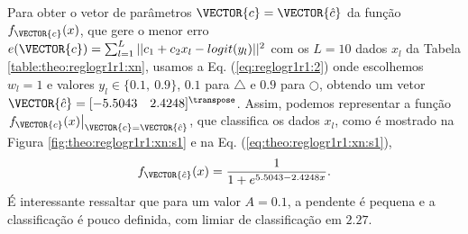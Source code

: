\begin{SolutionT}\label{sol:theo:reglogr1r1:s1}
Para obter o vetor de parâmetros $\VECTOR{c}=\VECTOR{\hat{c}}$ da função $f_{\VECTOR{c}}(x)$, 
que gere o menor erro $e(\VECTOR{c}) =  \sum_{l=1}^{L} ||c_1 +c_2 x_l-logit(y_l)||^2$
com os $L=10$ dados $x_l$ da Tabela \ref{table:theo:reglogr1r1:xn},
usamos a Eq. (\ref{eq:reglogr1r1:2}) onde escolhemos $w_l=1$ e valores $y_l \in \{0.1,~ 0.9\}$,
$0.1$ para $\bigtriangleup$ e $0.9$ para $\bigcirc$,
obtendo um vetor $\VECTOR{\hat{c}}=[-5.5043\quad 2.4248 ]^{\transpose}$.
Assim, podemos representar a função $\left.f_{\VECTOR{c}}(x)\right|_{\VECTOR{c}=\VECTOR{\hat{c}}}$, 
que classifica os dados $x_l$, 
como é mostrado na Figura \ref{fig:theo:reglogr1r1:xn:s1} e na Eq. (\ref{eq:theo:reglogr1r1:xn:s1}),
\begin{equation}\label{eq:theo:reglogr1r1:xn:s1}
f_{\VECTOR{\hat{c}}}(x)= \frac{1}{1+e^{ 5.5043-2.4248 x}}.
\end{equation}
É interessante ressaltar que para um valor $A=0.1$, a pendente é pequena e a classificação é pouco definida,
com limiar de classificação em $2.27$.
\end{SolutionT}

